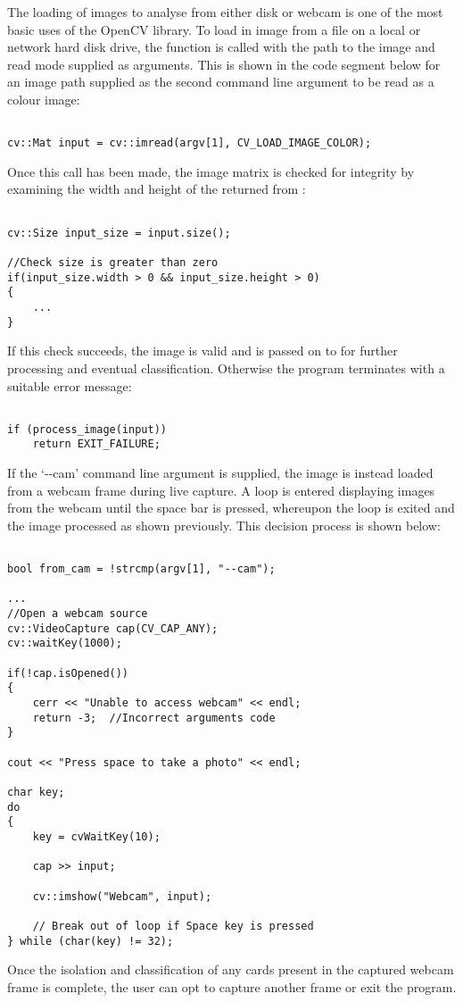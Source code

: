 		The loading of images to analyse from either disk or webcam is one of the most basic uses of the OpenCV library. To load in image from a file on a local or network hard disk drive, the  function is called with the path to the image and read mode supplied as arguments. This is shown in the code segment below for an image path supplied as the second command line argument to be read as a colour image:

		\begin{lstlisting}

cv::Mat input = cv::imread(argv[1], CV_LOAD_IMAGE_COLOR);
		\end{lstlisting}

		Once this call has been made, the image matrix is checked for integrity by examining the width and height of the  returned from :

		\begin{lstlisting}

cv::Size input_size = input.size();

//Check size is greater than zero
if(input_size.width > 0 && input_size.height > 0)
{
	...
}
		\end{lstlisting}

		If this check succeeds, the image is valid and is passed on to  for further processing and eventual classification. Otherwise the program terminates with a suitable error message:
		
		\begin{lstlisting}

if (process_image(input))
	return EXIT_FAILURE;
		\end{lstlisting}

		If the `-{}-cam' command line argument is supplied, the image is instead loaded from a webcam frame during live capture. A loop is entered displaying images from the webcam until the space bar is pressed, whereupon the loop is exited and the image processed as shown previously. This decision process is shown below:

		\begin{lstlisting}

bool from_cam = !strcmp(argv[1], "--cam");

...
//Open a webcam source
cv::VideoCapture cap(CV_CAP_ANY);
cv::waitKey(1000);

if(!cap.isOpened())
{
	cerr << "Unable to access webcam" << endl;
	return -3;  //Incorrect arguments code
}

cout << "Press space to take a photo" << endl;

char key;
do
{
	key = cvWaitKey(10);

	cap >> input;

	cv::imshow("Webcam", input);

	// Break out of loop if Space key is pressed
} while (char(key) != 32);
		\end{lstlisting}

		Once the isolation and classification of any cards present in the captured webcam frame is complete, the user can opt to capture another frame or exit the program.